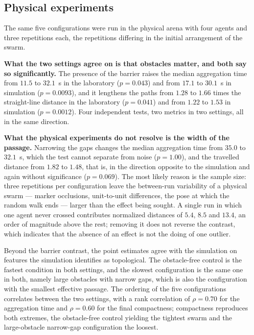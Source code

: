 \documentclass[conference]{IEEEtran}
\begin{document}
\subsection{Physical experiments}

The same five configurations were run in the physical arena with four agents and
three repetitions each, the repetitions differing in the initial arrangement of
the swarm.

\textbf{What the two settings agree on is that obstacles matter, and both say so
significantly.} The presence of the barrier raises the median aggregation time
from $11.5$ to $32.1$~s in the laboratory ($p = 0.043$) and from $17.1$ to
$30.1$~s in simulation ($p = 0.0093$), and it lengthens the paths from $1.28$ to
$1.66$ times the straight-line distance in the laboratory ($p = 0.041$) and from
$1.22$ to $1.53$ in simulation ($p = 0.0012$). Four independent tests, two
metrics in two settings, all in the same direction.

\textbf{What the physical experiments do not resolve is the width of the
passage.} Narrowing the gaps changes the median aggregation time from $35.0$ to
$32.1$~s, which the test cannot separate from noise ($p = 1.00$), and the
travelled distance from $1.82$ to $1.48$, that is, in the direction opposite to
the simulation and again without significance ($p = 0.069$). The most likely
reason is the sample size: three repetitions per configuration leave the
between-run variability of a physical swarm --- marker occlusions, unit-to-unit
differences, the pose at which the random walk ends --- larger than the effect
being sought. A single run in which one agent never crossed contributes
normalized distances of $5.4$, $8.5$ and $13.4$, an order of magnitude above the
rest; removing it does not reverse the contrast, which indicates that the
absence of an effect is not the doing of one outlier.

Beyond the barrier contrast, the point estimates agree with the simulation on
features the simulation identifies as topological. The obstacle-free control is
the fastest condition in both settings, and the slowest configuration is the same
one in both, namely large obstacles with narrow gaps, which is also the
configuration with the smallest effective passage. The ordering of the five
configurations correlates between the two settings, with a rank correlation of
$\rho = 0.70$ for the aggregation time and $\rho = 0.60$ for the final
compactness; compactness reproduces both extremes, the obstacle-free control
yielding the tightest swarm and the large-obstacle narrow-gap configuration the
loosest.
\end{document}
